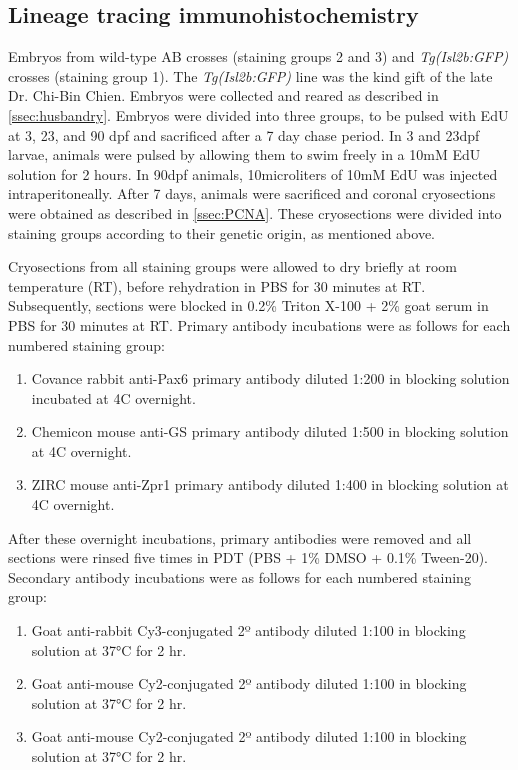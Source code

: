 \documentclass{ut-thesis}
\begin{document}
\begin{NoHyper}
\subsection{Lineage tracing immunohistochemistry}
\label{ssec:CMZlintrace}
Embryos from wild-type AB crosses (staining groups 2 and 3) and \textit{Tg(Isl2b:GFP)} crosses (staining group 1). The \textit{Tg(Isl2b:GFP)} line was the kind gift of the late Dr. Chi-Bin Chien. Embryos were collected and reared as described in \autoref{ssec:husbandry}. Embryos were divided into three groups, to be pulsed with EdU at 3, 23, and 90 dpf and sacrificed after a 7 day chase period. In 3 and 23dpf larvae, animals were pulsed by allowing them to swim freely in a 10mM EdU solution for 2 hours. In 90dpf animals, 10\si{micro}{liters} of 10mM EdU was injected intraperitoneally. After 7 days, animals were sacrificed and coronal cryosections were obtained as described in \autoref{ssec:PCNA}. These cryosections were divided into staining groups according to their genetic origin, as mentioned above.

Cryosections from all staining groups were allowed to dry briefly at room temperature (RT), before rehydration in PBS for 30 minutes at RT.  Subsequently, sections were blocked in 0.2\% Triton X-100 + 2\% goat serum in PBS for 30 minutes at RT. Primary antibody incubations were as follows for each numbered staining group:

\begin{enumerate}
    \item Covance rabbit anti-Pax6 primary antibody diluted 1:200 in blocking solution incubated at 4\degree C overnight.
    \item Chemicon mouse anti-GS primary antibody diluted 1:500 in blocking solution at 4\degree C overnight.
    \item ZIRC mouse anti-Zpr1 primary antibody diluted 1:400 in blocking solution at 4\degree C overnight.
\end{enumerate}

After these overnight incubations, primary antibodies were removed and all sections were rinsed five times in PDT (PBS + 1\% DMSO + 0.1\% Tween-20). Secondary antibody incubations were as follows for each numbered staining group:

\begin{enumerate}
    \item Goat anti-rabbit Cy3-conjugated 2º antibody diluted 1:100 in blocking solution at 37°C for 2 hr.
    \item Goat anti-mouse Cy2-conjugated 2º antibody diluted 1:100 in blocking solution at 37°C for 2 hr.
    \item Goat anti-mouse Cy2-conjugated 2º antibody diluted 1:100 in blocking solution at 37°C for 2 hr.
\end{enumerate}


\end{NoHyper}
\end{document}

